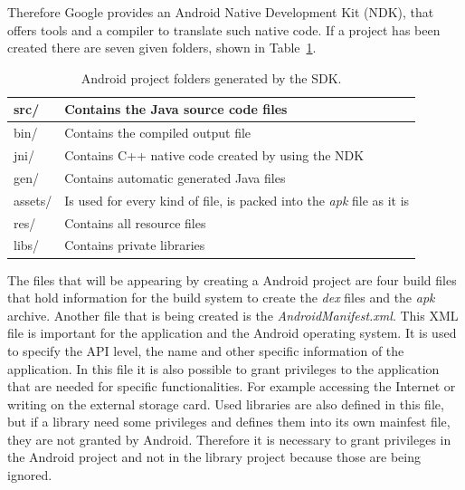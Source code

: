 Therefore Google provides an Android Native Development Kit (NDK), that offers tools and a compiler to translate such native code.
If a project has been created there are seven given folders, shown in Table~\ref{tab:android-project-folders}.
\begin {table}[htpb] 
  \centering
\begin {tabular} {|l|l|}
	\hline
	src/&Contains the Java source code files\\
	\hline
	bin/&Contains the compiled output file\\
	\hline
	jni/&Contains C++ native code created by using the NDK\\
	\hline
	gen/&Contains automatic generated Java files\\
	\hline
	assets/&Is used for every kind of file, is packed into the \textit{apk} file as it is\\
	\hline
	res/&Contains all resource files\\
	\hline
	libs/&Contains private libraries\\
	\hline
\end {tabular}
\caption {Android project folders generated by the SDK.}
\label {tab:android-project-folders}
\end {table}

The files that will be appearing by creating a Android project are four build files that hold information for the build system to create the \textit{dex} files and the \textit{apk} archive.
Another file that is being created is the \textit{AndroidManifest.xml}.
This XML file is important for the application and the Android operating system.
It is used to specify the API level, the name and other specific information of the application.
In this file it is also possible to grant privileges to the application that are needed for specific functionalities.
For example accessing the Internet or writing on the external storage card.
Used libraries are also defined in this file, but if a library need some privileges and defines them into its own mainfest file, they are not granted by Android.
Therefore it is necessary to grant privileges in the Android project and not in the library project because those are being ignored.


